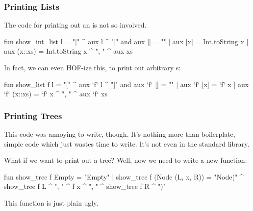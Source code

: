 \documentclass[aspectratio=169, handout]{beamer}
\begin{document}
\begin{frame}[fragile]
  \frametitle{Printing Lists}

  The code for printing out an  is not so involved.

  \vspace{\fill}

  \begin{codeblock}
    fun show_int_list l = "[" ^ aux l ^ "]"
    and aux [] = ""
      | aux [x] = Int.toString x
      | aux (x::xs) = Int.toString x ^ ", " ^ aux xs
  \end{codeblock}

  \vspace{\fill}

  In fact, we can even HOF-ize this, to print out arbitrary s:

  \vspace{\fill}

  \begin{codeblock}
    fun show_list f l = "[" ^ aux `f` l ^ "]"
    and aux `f` [] = ""
      | aux `f` [x] = `f` x
      | aux `f` (x::xs) = `f` x ^ ", " ^ aux `f` xs
  \end{codeblock}
\end{frame}

\begin{frame}[fragile]
  \frametitle{Printing Trees}

  This code was annoying to write, though. It's nothing more than boilerplate,
  simple code which just wastes time to write. It's not even in the standard
  library.

  \vspace{\fill}

  What if we want to print out a tree? Well, now we need to write a new function:
  \begin{codeblock}
    fun show_tree f Empty = "Empty"
      | show_tree f (Node (L, x, R)) =
          "Node("
            ^ show_tree f L
            ^ ", "
            ^ f x
            ^ ", "
            ^ show_tree f R
            ^ ")"
  \end{codeblock}

  \vspace{\fill}

  This function is just plain ugly.
\end{frame}
\end{document}
